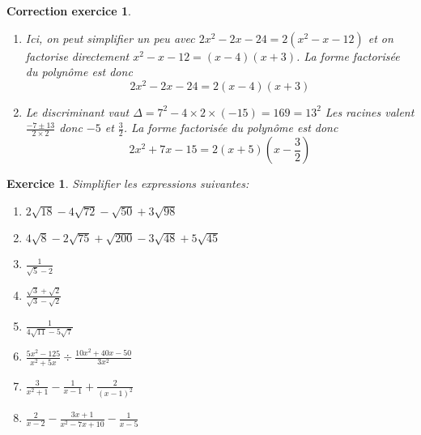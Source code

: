 \documentclass[12pt]{article}
\newtheorem{exercice}{\bf Exercice}
\newtheorem{correction}{\bf Correction exercice}
\newenvironment{exo}{
\begin{exercice}\smallskip\normalfont}{\end{exercice}
}
\newenvironment{cor}{
\begin{correction}\smallskip\normalfont}{\end{correction}
}
\begin{document}
\begin{cor}
\begin{enumerate}
\begin{equation*}
  \end{equation*}
  (ne pas oublier de tout multiplier par le coefficient de plus haut degr\'e, ici $2$)
\item
  Ici, on peut simplifier un peu avec $2x^2-2x-24 = 2(x^2 -x-12)$
  et on factorise directement $x^2-x-12 = (x-4)(x+3)$.
  La forme factoris\'ee du polyn\^ome est donc
  \begin{equation*}
    2x^2-2x-24 = 2(x-4)(x+3)
  \end{equation*}
\item
  Le discriminant vaut $\Delta = 7^2 - 4 \times 2 \times (-15) = 169 = 13^2$
  Les racines valent $\frac{-7 \pm 13}{2 \times 2}$ donc $-5$ et $\frac32$.
  La forme factoris\'ee du polyn\^ome est donc
  \begin{equation*}
    2x^2+7x-15 = 2(x+5)(x-\frac32)
  \end{equation*}
\end{enumerate}
\end{cor}
\color{black}
\fi


\begin{exo} Simplifier les expressions suivantes:
\begin{multicols}{2}
\begin{enumerate}
\item $2 \sqrt{18} - 4 \sqrt{72} - \sqrt{50} + 3\sqrt{98}$
\item $4\sqrt{8} -2\sqrt{75} + \sqrt{200}-3\sqrt{48}+5\sqrt{45}$
\item $\frac1{\sqrt{5}-2}$
\item $\frac{\sqrt{3}+\sqrt{2}}{\sqrt{3}-\sqrt{2}}$
\item $\frac1{4\sqrt{11} -5\sqrt{7}}$
\item $\frac{5x^2 - 125}{x^2 + 5x} \div \frac{10x^2 + 40x - 50}{3x^2}$
\item $\frac{3}{x^2+1} - \frac{1}{x-1} + \frac{2}{(x-1)^2}$
\item $\frac{2}{x-2} - \frac{3x+1}{x^2-7x+10} - \frac{1}{x-5}$
\end{enumerate}
\end{multicols}
\end{exo}
\end{document}
